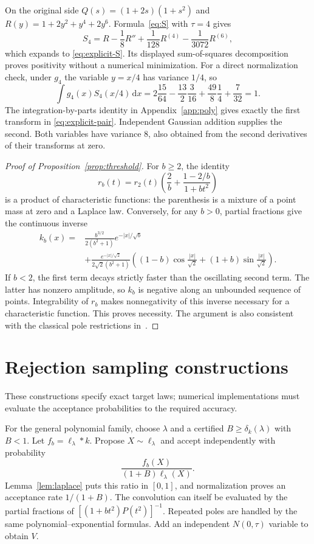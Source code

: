 \documentclass[11pt,twoside]{article}
\theoremstyle{journalplain}
\numberwithin{equation}{section}
\theoremstyle{journaldefinition}
\newcommand{\dd}{\,\mathrm d}
\begin{document}
On the original side $Q(s)=(1+2s)(1+s^2)$ and
$R(y)=1+2y^2+y^4+2y^6$. Formula~\eqref{eq:S} with $\tau=4$ gives
\[
 S_4=R-\frac18R''+\frac1{128}R^{(4)}-\frac1{3072}R^{(6)},
\]
which expands to \eqref{eq:explicit-S}. Its displayed sum-of-squares decomposition proves positivity without a numerical minimization. For a direct normalization check, under $g_4$ the variable $y=x/4$ has variance $1/4$, so
\[
 \int g_4(x)S_4(x/4)\dd x
 =2\frac{15}{64}-\frac{13}{2}\frac3{16}+\frac{49}{8}\frac14+\frac7{32}=1.
\]
The integration-by-parts identity in Appendix~\ref{app:poly} gives exactly the first transform in \eqref{eq:explicit-pair}. Independent Gaussian addition supplies the second. Both variables have variance $8$, also obtained from the second derivatives of their transforms at zero.


\begin{proof}[Proof of Proposition~\ref{prop:threshold}]
For $b\ge2$, the identity
\[
 r_b(t)=r_2(t)\left(\frac2b+\frac{1-2/b}{1+bt^2}\right)
\]
is a product of characteristic functions: the parenthesis is a mixture of a point mass at zero and a Laplace law. Conversely, for any $b>0$, partial fractions give the continuous inverse
\begin{align*}
 k_b(x)={}&\frac{b^{3/2}}{2(b^2+1)}e^{-|x|/\sqrt b}\\
 &+\frac{e^{-|x|/\sqrt2}}{2\sqrt2(b^2+1)}
 \left((1-b)\cos\frac{|x|}{\sqrt2}+(1+b)\sin\frac{|x|}{\sqrt2}\right).
\end{align*}
If $b<2$, the first term decays strictly faster than the oscillating second term. The latter has nonzero amplitude, so $k_b$ is negative along an unbounded sequence of points. Integrability of $r_b$ makes nonnegativity of this inverse necessary for a characteristic function. This proves necessity. The argument is also consistent with the classical pole restrictions in\ \cite{LukacsSzasz1954II}.
\end{proof}

\section{Rejection sampling constructions}\label{app:sampling}
These constructions specify exact target laws; numerical implementations must evaluate the acceptance probabilities to the required accuracy.

For the general polynomial family, choose $\lambda$ and a certified $B\ge\delta_k(\lambda)$ with $B<1$. Let $f_b=\ell_\lambda*k$. Propose $X\sim\ell_\lambda$ and accept independently with probability
\[
 \frac{f_b(X)}{(1+B)\ell_\lambda(X)}.
\]
Lemma~\ref{lem:laplace} puts this ratio in $[0,1]$, and normalization proves an acceptance rate $1/(1+B)$. The convolution can itself be evaluated by the partial fractions of $[(1+bt^2)P(t^2)]^{-1}$. Repeated poles are handled by the same polynomial--exponential formulas. Add an independent $N(0,\tau)$ variable to obtain $V$.
\end{document}
